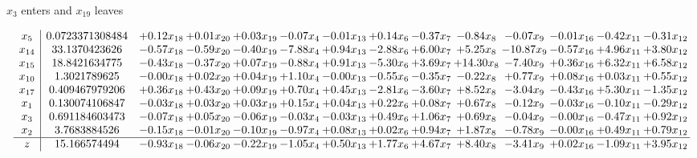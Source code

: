 \documentclass[8pt]{article}
\begin{document}
 $ x_{3} $ enters and $ x_{19} $ leaves 

 \[\begin{array}{c| c c@{\hskip 2pt} c@{\hskip 2pt} c@{\hskip 2pt} c@{\hskip 2pt} c@{\hskip 2pt} c@{\hskip 2pt} c@{\hskip 2pt} c@{\hskip 2pt} c@{\hskip 2pt} c@{\hskip 2pt} c@{\hskip 2pt} c@{\hskip 2pt} }
 x_{5}   &  0.0723371308484 & +  0.12 x_{18} & +  0.01 x_{20} & +  0.03 x_{19} & -0.07 x_{4} & -0.01 x_{13} & +  0.14 x_{6} & -0.37 x_{7} & -0.84 x_{8} & -0.07 x_{9} & -0.01 x_{16} & -0.42 x_{11} & -0.31 x_{12}\\
 x_{14}   &  33.1370423626 & -0.57 x_{18} & -0.59 x_{20} & -0.40 x_{19} & -7.88 x_{4} & +  0.94 x_{13} & -2.88 x_{6} & +  6.00 x_{7} & +  5.25 x_{8} & -10.87 x_{9} & -0.57 x_{16} & +  4.96 x_{11} & +  3.80 x_{12}\\
 x_{15}   &  18.8421634775 & -0.43 x_{18} & -0.37 x_{20} & +  0.07 x_{19} & -0.88 x_{4} & +  0.91 x_{13} & -5.30 x_{6} & +  3.69 x_{7} & + 14.30 x_{8} & -7.40 x_{9} & +  0.36 x_{16} & +  6.32 x_{11} & +  6.58 x_{12}\\
 x_{10}   &  1.3021789625 & -0.00 x_{18} & +  0.02 x_{20} & +  0.04 x_{19} & +  1.10 x_{4} & -0.00 x_{13} & -0.55 x_{6} & -0.35 x_{7} & -0.22 x_{8} & +  0.77 x_{9} & +  0.08 x_{16} & +  0.03 x_{11} & +  0.55 x_{12}\\
 x_{17}   &  0.409467979206 & +  0.36 x_{18} & +  0.43 x_{20} & +  0.09 x_{19} & +  0.70 x_{4} & +  0.45 x_{13} & -2.81 x_{6} & -3.60 x_{7} & +  8.52 x_{8} & -3.04 x_{9} & -0.43 x_{16} & +  5.30 x_{11} & -1.35 x_{12}\\
 x_{1}   &  0.130074106847 & -0.03 x_{18} & +  0.03 x_{20} & +  0.03 x_{19} & +  0.15 x_{4} & +  0.04 x_{13} & +  0.22 x_{6} & +  0.08 x_{7} & +  0.67 x_{8} & -0.12 x_{9} & -0.03 x_{16} & -0.10 x_{11} & -0.29 x_{12}\\
 x_{3}   &  0.691184603473 & -0.07 x_{18} & +  0.05 x_{20} & -0.06 x_{19} & -0.03 x_{4} & -0.03 x_{13} & +  0.49 x_{6} & +  1.06 x_{7} & +  0.69 x_{8} & -0.04 x_{9} & -0.00 x_{16} & -0.47 x_{11} & +  0.92 x_{12}\\
 x_{2}   &  3.7683884526 & -0.15 x_{18} & -0.01 x_{20} & -0.10 x_{19} & -0.97 x_{4} & +  0.08 x_{13} & +  0.02 x_{6} & +  0.94 x_{7} & +  1.87 x_{8} & -0.78 x_{9} & -0.00 x_{16} & +  0.49 x_{11} & +  0.79 x_{12}\\
\hline
z    &  15.166574494 & -0.93 x_{18} & -0.06 x_{20} & -0.22 x_{19} & -1.05 x_{4} & +  0.50 x_{13} & +  1.77 x_{6} & +  4.67 x_{7} & +  8.40 x_{8} & -3.41 x_{9} & +  0.02 x_{16} & -1.09 x_{11} & +  3.95 x_{12}\\
\end{array}\]
\end{document}
